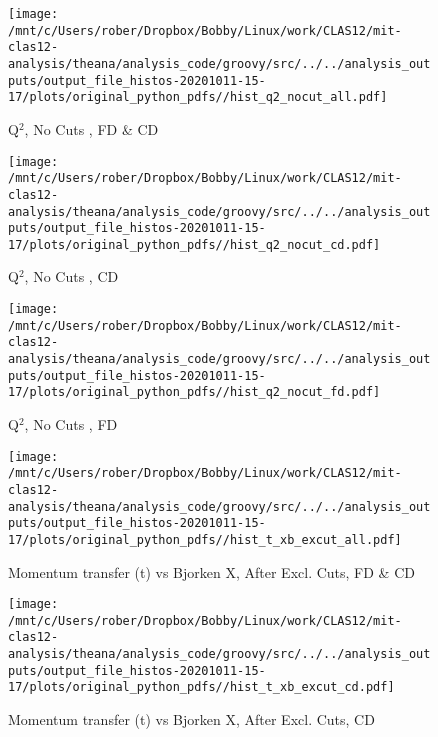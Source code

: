 \documentclass{article}
\begin{document}
\begin{landscape}
    \begin{figure}[h]
        \centering

        \texttt{[image: /mnt/c/Users/rober/Dropbox/Bobby/Linux/work/CLAS12/mit-clas12-analysis/theana/analysis\_code/groovy/src/../../analysis\_outputs/output\_file\_histos-20201011-15-17/plots/original\_python\_pdfs//hist\_q2\_nocut\_all.pdf]}
        \captionsetup{textformat=empty,labelformat=blank}
        \caption{Q$^{2}$, No Cuts , FD \& CD}
    \end{figure}
    \clearpage
    
    \begin{figure}[h]
        \centering

        \texttt{[image: /mnt/c/Users/rober/Dropbox/Bobby/Linux/work/CLAS12/mit-clas12-analysis/theana/analysis\_code/groovy/src/../../analysis\_outputs/output\_file\_histos-20201011-15-17/plots/original\_python\_pdfs//hist\_q2\_nocut\_cd.pdf]}
        \captionsetup{textformat=empty,labelformat=blank}
        \caption{Q$^{2}$, No Cuts , CD}
    \end{figure}
    \clearpage
    
    \begin{figure}[h]
        \centering

        \texttt{[image: /mnt/c/Users/rober/Dropbox/Bobby/Linux/work/CLAS12/mit-clas12-analysis/theana/analysis\_code/groovy/src/../../analysis\_outputs/output\_file\_histos-20201011-15-17/plots/original\_python\_pdfs//hist\_q2\_nocut\_fd.pdf]}
        \captionsetup{textformat=empty,labelformat=blank}
        \caption{Q$^{2}$, No Cuts , FD}
    \end{figure}
    \clearpage
    
    \begin{figure}[h]
        \centering

        \texttt{[image: /mnt/c/Users/rober/Dropbox/Bobby/Linux/work/CLAS12/mit-clas12-analysis/theana/analysis\_code/groovy/src/../../analysis\_outputs/output\_file\_histos-20201011-15-17/plots/original\_python\_pdfs//hist\_t\_xb\_excut\_all.pdf]}
        \captionsetup{textformat=empty,labelformat=blank}
        \caption{Momentum transfer (t) vs Bjorken X, After Excl. Cuts, FD \& CD}
    \end{figure}
    \clearpage
    
    \begin{figure}[h]
        \centering

        \texttt{[image: /mnt/c/Users/rober/Dropbox/Bobby/Linux/work/CLAS12/mit-clas12-analysis/theana/analysis\_code/groovy/src/../../analysis\_outputs/output\_file\_histos-20201011-15-17/plots/original\_python\_pdfs//hist\_t\_xb\_excut\_cd.pdf]}
        \captionsetup{textformat=empty,labelformat=blank}
        \caption{Momentum transfer (t) vs Bjorken X, After Excl. Cuts, CD}
    \end{figure}
    \clearpage
    

\end{landscape}
\end{document}
